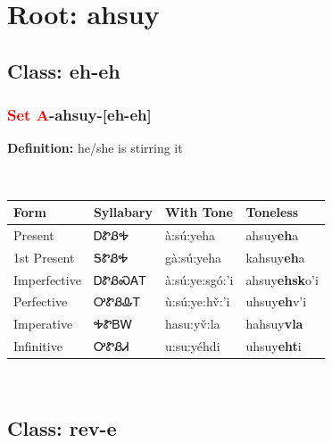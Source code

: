 \needspace{4in}
\section*{Root: ahsuy}
\nopagebreak
{}
\needspace{3in}
\subsection*{Class: eh-eh}
\nopagebreak
\needspace{2in}
\subsubsection*{\textcolor{Red}{Set A}{-}\textbf{ahsuy}{-}[eh-eh]}
\nopagebreak
\textbf{Definition: } he/she is stirring it
\\[0.5em]
\begin{tabularx}{\textwidth}{l X X X}%
\toprule%
\textbf{Form}&\textbf{Syllabary}&\textbf{With Tone}&\textbf{Toneless}\\%
\midrule%
Present&ᎠᏑᏰᎭ&à:sú:yeha&ahsuy\textbf{eh}a\\%
1st Present&ᎦᏑᏰᎭ&gà:sú:yeha&kahsuy\textbf{eh}a\\%
Imperfective&ᎠᏑᏰᏍᎪᎢ&à:sú:ye:sgó:’i&ahsuy\textbf{ehsk}o'i\\%
Perfective&ᎤᏑᏰᎲᎢ&ù:sú:ye:hv̌:’i&uhsuy\textbf{eh}v'i\\%
Imperative&ᎭᏑᏴᎳ&hasu:yv̌:la&hahsuy\textbf{vla}\\%
Infinitive&ᎤᏑᏰᏗ&u:su:yéhdi&uhsuy\textbf{eht}i\\%
\bottomrule%
\end{tabularx}
\\[1em]
\needspace{3in}
\subsection*{Class: rev-e}
\nopagebreak
\needspace{2in}
